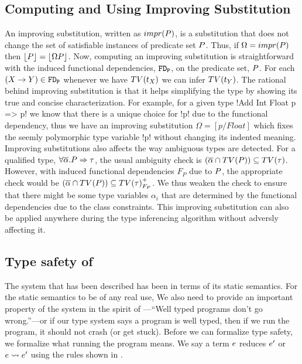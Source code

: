 \documentclass[format=sigplan,manuscript,review,screen,nonacm,margin=1in]{acmart}
\begin{document}
\subsection{Computing and Using Improving Substitution}\label{subsec:fd-improve}
An improving substitution, written as $impr(P)$, is a substitution that does not change the set of
satisfiable instances of predicate set $P$.
Thus, if $\Omega = impr(P)$ then $\lfloor P\rfloor = \lfloor\Omega P\rfloor$. Now, computing
an improving substitution is straightforward with the induced functional
dependencies, $\texttt{FD}_\texttt{P}$, on the predicate set, $P$.
For each $(X \to Y)\in\texttt{FD}_\texttt{P}$
whenever we have $TV(t_X)$ we can infer $TV(t_Y)$. The rational behind
improving substitution is that it helps simplifying the type by showing its true
and concise characterization. For example, for a given type !Add Int Float p => p!
we know that there is a unique choice for !p! due to the functional dependency,
thus we have an improving substitution $\Omega = [p/Float]$ which
fixes the seemly polymorphic type variable !p! without changing its indented meaning.
Improving substitutions also affects the way ambiguous types are detected.
For a qualified type, $\forall\overline{\alpha}.P\Rightarrow\tau$, the usual ambiguity
check is $(\overline{\alpha}\cap TV(P)) \subseteq TV(\tau)$. However, with induced functional dependencies $F_P$
due to $P$, the appropriate check would be $(\overline{\alpha}\cap TV(P)) \subseteq {TV(\tau)}^{+}_{F_P}$.
We thus weaken the check to ensure that there might be some type variables $\alpha_i$ that are determined by the
functional dependencies due to the class constraints. This improving substitution can also be applied
anywhere during the type inferencing algorithm without adversly affecting it.

\subsection{Type safety of \TCFD{}}\label{subsec:tcfd-safety}
The system that has been described has been in terms of its static semantics.
For the static semantics to be of any real use, We also need to provide an important property
of the system in the spirit of \cite{milner_theory_1978}---``Well typed programs
don't go wrong.''---or if our type system says a program is well typed, then if we run the program,
it should not crash (or get stuck). Before we can formalize type safety, we formalize
what running the program means. We say a term $e$ reduces $e'$ or $e \rightsquigarrow e'$
using the rules shown in .
\newcommand\AppR{
  \ib{\irule[\trule{s-app}]
    {\stepsto {\Tm_1} {\Tm'_1}};
    {\stepsto {\Tm_1\App\Tm_2} {\Tm'_1\App\Tm_2}}}
}
\newcommand\BetaR{
  \ib{\irule[\trule{s-$\beta$}];
    {\stepsto {(\Lam x \tau \Tm_1)\App\Tm_2} {\Tm_1[x/\Tm_2]}}
  }
}
\end{document}
